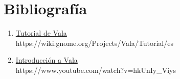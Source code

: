 \documentclass{article}
\begin{document}
    \section*{Bibliografía}
    \newcommand*{\biblio}[2]{\item \href{#2}{#1}\\\textsf{#2}}
    \begin{enumerate}
        \biblio{Tutorial de Vala}{https://wiki.gnome.org/Projects/Vala/Tutorial/es}
        \biblio{Introducción a Vala}{https://www.youtube.com/watch?v=hkUnIy\_Viys}
    \end{enumerate}
\end{document}
